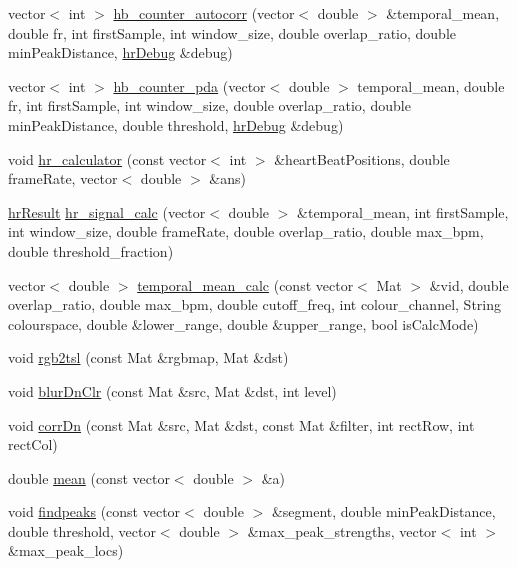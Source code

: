 \begin{DoxyCompactItemize}
\item 
vector$<$ int $>$ \hyperlink{namespace_m_h_r_a62a720e54584696fcf7e2d545ad202dc}{hb\+\_\+counter\+\_\+autocorr} (vector$<$ double $>$ \&temporal\+\_\+mean, double fr, int first\+Sample, int window\+\_\+size, double overlap\+\_\+ratio, double min\+Peak\+Distance, \hyperlink{struct_m_h_r_1_1hr_debug}{hr\+Debug} \&debug)
\item 
vector$<$ int $>$ \hyperlink{namespace_m_h_r_ac8cf9fb76b7455034653c17bc9e3ee4c}{hb\+\_\+counter\+\_\+pda} (vector$<$ double $>$ temporal\+\_\+mean, double fr, int first\+Sample, int window\+\_\+size, double overlap\+\_\+ratio, double min\+Peak\+Distance, double threshold, \hyperlink{struct_m_h_r_1_1hr_debug}{hr\+Debug} \&debug)
\item 
void \hyperlink{namespace_m_h_r_a4ba8de262585ae09cd1564fcfda5742e}{hr\+\_\+calculator} (const vector$<$ int $>$ \&heart\+Beat\+Positions, double frame\+Rate, vector$<$ double $>$ \&ans)
\item 
\hyperlink{struct_m_h_r_1_1hr_result}{hr\+Result} \hyperlink{namespace_m_h_r_ac8025fa73e928ab097c9b58525d787b1}{hr\+\_\+signal\+\_\+calc} (vector$<$ double $>$ \&temporal\+\_\+mean, int first\+Sample, int window\+\_\+size, double frame\+Rate, double overlap\+\_\+ratio, double max\+\_\+bpm, double threshold\+\_\+fraction)
\item 
vector$<$ double $>$ \hyperlink{namespace_m_h_r_a6f102a7f405b6c84ea84f4d99e3dd847}{temporal\+\_\+mean\+\_\+calc} (const vector$<$ Mat $>$ \&vid, double overlap\+\_\+ratio, double max\+\_\+bpm, double cutoff\+\_\+freq, int colour\+\_\+channel, String colourspace, double \&lower\+\_\+range, double \&upper\+\_\+range, bool is\+Calc\+Mode)
\item 
void \hyperlink{namespace_m_h_r_ae8dc1afd1e611d432d98186da1f813e5}{rgb2tsl} (const Mat \&rgbmap, Mat \&dst)
\item 
void \hyperlink{namespace_m_h_r_a357c28865a17017a73d0f4ae8c4f7480}{blur\+Dn\+Clr} (const Mat \&src, Mat \&dst, int level)
\item 
void \hyperlink{namespace_m_h_r_a30571de29e1537d20abf69d19329c1bb}{corr\+Dn} (const Mat \&src, Mat \&dst, const Mat \&filter, int rect\+Row, int rect\+Col)
\item 
double \hyperlink{namespace_m_h_r_af6125176deb7b4d4d503a4bcf851a076}{mean} (const vector$<$ double $>$ \&a)
\item 
void \hyperlink{namespace_m_h_r_ad11b22e616f937a6817faa9a0c72ec21}{findpeaks} (const vector$<$ double $>$ \&segment, double min\+Peak\+Distance, double threshold, vector$<$ double $>$ \&max\+\_\+peak\+\_\+strengths, vector$<$ int $>$ \&max\+\_\+peak\+\_\+locs)

\end{DoxyCompactItemize}
